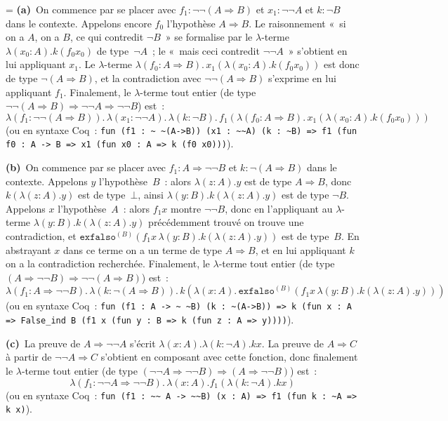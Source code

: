 \documentclass[12pt,a4paper]{article}
\theoremstyle{definition}
\newif\ifcorrige
\newenvironment{corrige}%
{\ifcorrige\relax\else\setbox0=\vbox\bgroup\fi%
\smallbreak\footnotesize\noindent{\underbar{\textit{Corrigé.}}\quad}}
{{\hbox{}\nobreak\hfill\checkmark}%
\ifcorrige\relax\else\egroup\fi\par}
\begin{document}
\begin{corrige}
\textbf{(a)} On commence par se placer avec $f_1:\neg\neg(A\Rightarrow
B)$ et $x_1:\neg\neg A$ et $k:\neg B$ dans le contexte.  Appelons
encore $f_0$ l'hypothèse $A\Rightarrow B$.  Le raisonnement « si on a
$A$, on a $B$, ce qui contredit $\neg B$ » se formalise par le
$\lambda$-terme $\lambda(x_0:A). k(f_0 x_0)$ de type $\neg A$ ; le
« mais ceci contredit $\neg\neg A$ » s'obtient en lui appliquant
$x_1$.  Le $\lambda$-terme $\lambda(f_0:A\Rightarrow B).\,
x_1(\lambda(x_0:A). k(f_0 x_0))$ est donc de type $\neg(A\Rightarrow
B)$, et la contradiction avec $\neg\neg(A\Rightarrow B)$ s'exprime en
lui appliquant $f_1$.  Finalement, le $\lambda$-terme tout entier (de
type $\neg\neg(A\Rightarrow B) \Rightarrow \neg\neg
A\Rightarrow\neg\neg B$) est :
\[
\lambda(f_1:\neg\neg(A\Rightarrow B)).\,
\lambda(x_1:\neg\neg A).\,\lambda(k:\neg B).\,
f_1(\lambda(f_0:A\Rightarrow B).\,
x_1(\lambda(x_0:A). k(f_0 x_0)))
\]
(ou en syntaxe Coq : \texttt{fun (f1 : \textasciitilde
  \textasciitilde(A->B)) (x1 : \textasciitilde\textasciitilde A) (k :
  \textasciitilde B) => f1 (fun f0 : A -> B => x1 (fun x0 : A => k (f0
  x0)))}).

\textbf{(b)} On commence par se placer avec $f_1:A\Rightarrow \neg\neg
B$ et $k:\neg(A\Rightarrow B)$ dans le contexte.  Appelons $y$
l'hypothèse $B$ : alors $\lambda(z:A).y$ est de type $A\Rightarrow B$,
donc $k(\lambda(z:A).y)$ est de type $\bot$, ainsi
$\lambda(y:B).k(\lambda(z:A).y)$ est de type $\neg B$.  Appelons $x$
l'hypothèse $A$ : alors $f_1 x$ montre $\neg\neg B$, donc en
l'appliquant au $\lambda$-terme $\lambda(y:B).k(\lambda(z:A).y)$
précédemment trouvé on trouve une contradiction, et
$\texttt{exfalso}^{(B)}(f_1 x \, \lambda(y:B).k(\lambda(z:A).y))$ est
de type $B$.  En abstrayant $x$ dans ce terme on a un terme de type
$A\Rightarrow B$, et en lui appliquant $k$ on a la contradiction
recherchée.  Finalement, le $\lambda$-terme tout entier (de type
$(A\Rightarrow\neg\neg B) \Rightarrow \neg\neg(A\Rightarrow B)$) est :
\[
\lambda(f_1:A\Rightarrow \neg\neg B).\,
\lambda(k:\neg(A\Rightarrow B)).\,
k(\lambda(x:A).\,\texttt{exfalso}^{(B)}(f_1 x \, \lambda(y:B).k(\lambda(z:A).y)))
\]
(ou en syntaxe Coq : \texttt{fun (f1 : A -> \textasciitilde
  \textasciitilde B) (k : \textasciitilde (A->B)) => k (fun x : A =>
  False\_ind B (f1 x (fun y : B => k (fun z : A => y))))}).

\textbf{(c)} La preuve de $A \Rightarrow \neg\neg A$ s'écrit
$\lambda(x:A).\lambda(k:\neg A).kx$.  La preuve de $A\Rightarrow C$ à
partir de $\neg\neg A \Rightarrow C$ s'obtient en composant avec cette
fonction, donc finalement le $\lambda$-terme tout entier (de type
$(\neg\neg A\Rightarrow\neg\neg B) \Rightarrow (A\Rightarrow\neg\neg
B)$) est :
\[
\lambda(f_1:\neg\neg A\Rightarrow \neg\neg B).\,
\lambda(x:A).f_1(\lambda(k:\neg A).kx)
\]
(ou en syntaxe Coq : \texttt{fun (f1 : \textasciitilde\textasciitilde
  A -> \textasciitilde\textasciitilde B) (x : A) => f1 (fun k :
  \textasciitilde A => k x)}).


\end{corrige}
\end{document}

